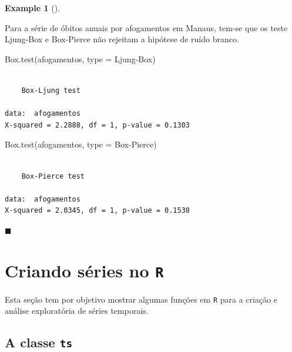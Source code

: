 \documentclass[
  letterpaper,
  DIV=11,
  numbers=noendperiod]{scrreprt}
\newenvironment{Shaded}{\begin{snugshade}}{\end{snugshade}}
\newcommand{\AttributeTok}[1]{\textcolor[rgb]{0.40,0.45,0.13}{#1}}
\newcommand{\FunctionTok}[1]{\textcolor[rgb]{0.28,0.35,0.67}{#1}}
\newcommand{\NormalTok}[1]{\textcolor[rgb]{0.00,0.23,0.31}{#1}}
\newcommand{\StringTok}[1]{\textcolor[rgb]{0.13,0.47,0.30}{#1}}
\theoremstyle{plain}
\theoremstyle{definition}
\theoremstyle{definition}
\newtheorem{example}{Example}[chapter]
\theoremstyle{remark}
\begin{document}
\begin{example}[]\protect\hypertarget{exm-afogamentos_testes}{}\label{exm-afogamentos_testes}

Para a série de óbitos anuais por afogamentos em Manaus, tem-se que os
teste Ljung-Box e Box-Pierce não rejeitam a hipótese de ruído branco.

\begin{Shaded}
\begin{Highlighting}[]
\FunctionTok{Box.test}\NormalTok{(afogamentos, }\AttributeTok{type =} \StringTok{\textquotesingle{}Ljung{-}Box\textquotesingle{}}\NormalTok{)}
\end{Highlighting}
\end{Shaded}

\begin{verbatim}

    Box-Ljung test

data:  afogamentos
X-squared = 2.2888, df = 1, p-value = 0.1303
\end{verbatim}

\begin{Shaded}
\begin{Highlighting}[]
\FunctionTok{Box.test}\NormalTok{(afogamentos, }\AttributeTok{type =} \StringTok{\textquotesingle{}Box{-}Pierce\textquotesingle{}}\NormalTok{)}
\end{Highlighting}
\end{Shaded}

\begin{verbatim}

    Box-Pierce test

data:  afogamentos
X-squared = 2.0345, df = 1, p-value = 0.1538
\end{verbatim}

\(\blacksquare\)

\end{example}


\hypertarget{criando-suxe9ries-no-r}{%
\chapter{\texorpdfstring{Criando séries no
\texttt{R}}{Criando séries no R}}\label{criando-suxe9ries-no-r}}

Esta seção tem por objetivo mostrar algumas funções em \texttt{R} para a
criação e análise exploratória de séries temporais.

\hypertarget{a-classe-ts}{%
\section{\texorpdfstring{A classe
\texttt{ts}}{A classe ts}}\label{a-classe-ts}}
\end{document}
